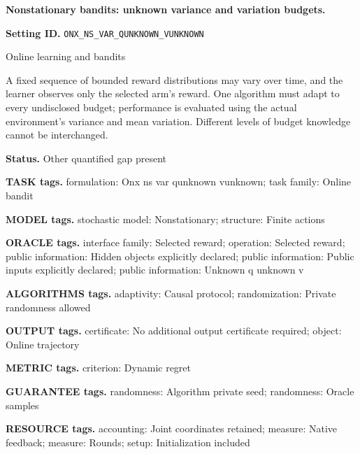 \documentclass[10pt,a4paper]{article}
\begin{document}
\raggedright

{\LARGE\bfseries\sffamily\color{AtlasNavy} Nonstationary bandits: unknown variance and variation budgets.\par}\vspace{5pt}


\textbf{Setting ID.} \texttt{ONX\_\allowbreak{}NS\_\allowbreak{}VAR\_\allowbreak{}QUNKNOWN\_\allowbreak{}VUNKNOWN}



Online learning and bandits



A fixed sequence of bounded reward distributions may vary over time, and the learner observes only the selected arm's reward. One algorithm must adapt to every undisclosed budget; performance is evaluated using the actual environment's variance and mean variation. Different levels of budget knowledge cannot be interchanged.



\textbf{Status.} Other quantified gap present



\textbf{TASK tags.} formulation: Onx ns var qunknown vunknown; task family: Online bandit



\textbf{MODEL tags.} stochastic model: Nonstationary; structure: Finite actions



\textbf{ORACLE tags.} interface family: Selected reward; operation: Selected reward; public information: Hidden objects explicitly declared; public information: Public inputs explicitly declared; public information: Unknown q unknown v



\textbf{ALGORITHMS tags.} adaptivity: Causal protocol; randomization: Private randomness allowed



\textbf{OUTPUT tags.} certificate: No additional output certificate required; object: Online trajectory



\textbf{METRIC tags.} criterion: Dynamic regret



\textbf{GUARANTEE tags.} randomness: Algorithm private seed; randomness: Oracle samples



\textbf{RESOURCE tags.} accounting: Joint coordinates retained; measure: Native feedback; measure: Rounds; setup: Initialization included
\end{document}
